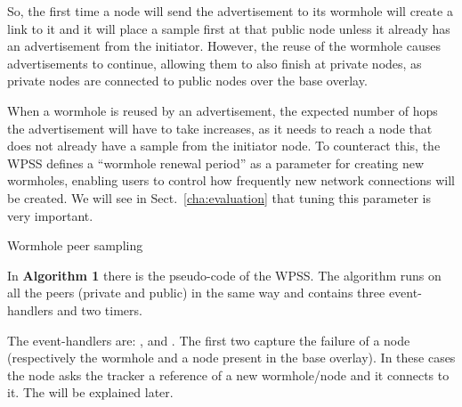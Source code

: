 So, the first time a node will send the advertisement to its wormhole will create a link to it and it will place a sample first at that public node unless it already has an advertisement from the initiator. However, the reuse of the wormhole causes advertisements to continue, allowing them to also finish at private nodes, as private nodes are connected to public nodes over the base overlay. 

When a wormhole is reused by an advertisement, the expected number of hops the advertisement will have to take increases, as it needs to reach a node that does not already have a sample from the initiator node. To counteract this, the \ac{WPSS} defines a ``wormhole renewal period'' as a parameter for creating new wormholes, enabling users to control how frequently new network connections will be created. We will see in Sect.~\ref{cha:evaluation} that tuning this parameter is very important. 


\begin{algorithm}[H]






 \caption{Wormhole peer sampling}
\end{algorithm}

In \textbf{Algorithm 1} there is the pseudo-code of the \ac{WPSS}. The algorithm runs on all the peers (private and public) in the same way and contains three event-handlers and two timers. 

The event-handlers are: \wormholeFailure, \baseOverlayFailure and \receivedAd. The first two capture the failure of a node (respectively the wormhole and a node present in the base overlay). In these cases the node asks the tracker a reference of a new wormhole/node and it connects to it. The \receivedAd will be explained later.

